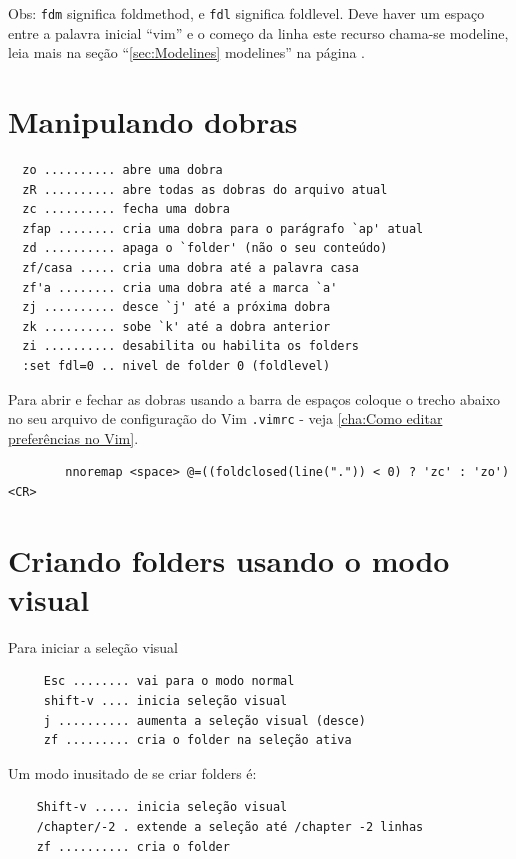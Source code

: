 \documentclass[10pt,a4paper,openany]{book}
\begin{document}
Obs: \verb|fdm| significa foldmethod, e \verb|fdl| significa
foldlevel. Deve haver um espaço entre a palavra inicial ``vim'' e o
começo da linha este recurso chama-se modeline, leia mais na seção
``\ref{sec:Modelines} modelines'' na página \pageref{sec:Modelines}.

\section{Manipulando dobras }\label{Manipulando dobras }

\begin{verbatim}
  zo .......... abre uma dobra
  zR .......... abre todas as dobras do arquivo atual
  zc .......... fecha uma dobra
  zfap ........ cria uma dobra para o parágrafo `ap' atual
  zd .......... apaga o `folder' (não o seu conteúdo)
  zf/casa ..... cria uma dobra até a palavra casa
  zf'a ........ cria uma dobra até a marca `a'
  zj .......... desce `j' até a próxima dobra
  zk .......... sobe `k' até a dobra anterior
  zi .......... desabilita ou habilita os folders
  :set fdl=0 .. nivel de folder 0 (foldlevel)
\end{verbatim}

Para abrir e fechar as dobras usando a barra de
espaços coloque o trecho abaixo no seu arquivo de configuração do Vim
\verb|.vimrc| - veja \ref{cha:Como editar preferências no Vim}.

\begin{verbatim}
		nnoremap <space> @=((foldclosed(line(".")) < 0) ? 'zc' : 'zo')<CR>
\end{verbatim}

\section{Criando folders usando o modo visual}
\label{Criando folders usando o modo visual}
Para iniciar a seleção visual

\begin{verbatim}
	 Esc ........ vai para o modo normal
	 shift-v .... inicia seleção visual
	 j .......... aumenta a seleção visual (desce)
	 zf ......... cria o folder na seleção ativa
\end{verbatim}

Um modo inusitado de se criar folders é:

\begin{verbatim}
	Shift-v ..... inicia seleção visual
	/chapter/-2 . extende a seleção até /chapter -2 linhas
	zf .......... cria o folder
\end{verbatim}
\end{document}
